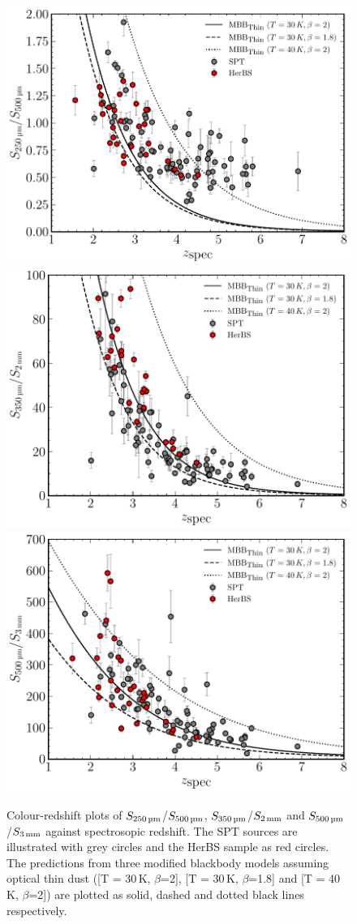 \begin{figure}
    \centering
    \includegraphics[width=0.5\columnwidth,height=0.26\textheight]{Figures/spt_herbs_colour_250_500.pdf}
    \includegraphics[width=0.5\columnwidth,height=0.26\textheight]{Figures/spt_herbs_colour_350_2000.pdf}
    \includegraphics[width=0.5\columnwidth,height=0.26\textheight]{Figures/spt_herbs_colour_500_3000.pdf}
    \caption{Colour-redshift plots of $S_{\small 250\,\textrm{\textmu m}}$/$S_{\small 500\,\textrm{\textmu m}}$, $S_{\small 350\,\textrm{\textmu m}}$/$S_{\small 2\,\textrm{mm}}$ and $S_{\small 500\,\textrm{\textmu m}}$/$S_{\small 3\,\textrm{mm}}$ against spectrosopic redshift. The SPT sources are illustrated with grey circles and the HerBS sample as red circles. The predictions from three modified blackbody models assuming optical thin dust ([T = 30\,K, $\beta$=2], [T = 30\,K, $\beta$=1.8] and [T = 40\,K, $\beta$=2]) are plotted as solid, dashed and dotted black lines respectively.}
    \label{fig:spt_herbs_colour_redshift}
\end{figure}

